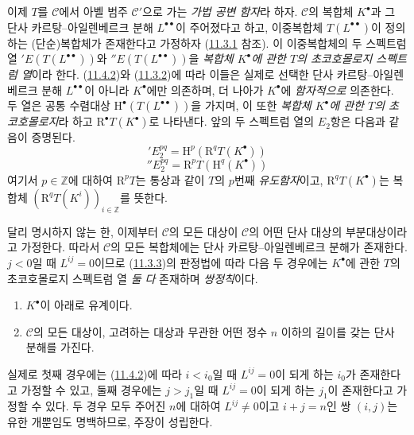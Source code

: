 \begin{env}[11.4.3]
\label{0.11.4.3-fr}
이제 $T$를 $\mathcal C$에서 아벨 범주 $\mathcal C'$으로 가는
\emph{가법 공변 함자}라 하자. $\mathcal C$의 복합체 $K^\bullet$과
그 단사 카르탕--아일렌베르크 분해 $L^{\bullet\bullet}$이 주어졌다고
하고, 이중복합체 $T(L^{\bullet\bullet})$이 정의하는 (단순)복합체가
존재한다고 가정하자
(\hyperref[0.11.3.1-fr]{11.3.1} 참조). 이 이중복합체의 두 스펙트럼 열
$'E(T(L^{\bullet\bullet}))$와 $''E(T(L^{\bullet\bullet}))$을
\emph{복합체 $K^\bullet$에 관한 $T$의 초코호몰로지 스펙트럼 열}이라
한다. (\hyperref[0.11.4.2-fr]{11.4.2})와
(\hyperref[0.11.3.2-fr]{11.3.2})에 따라 이들은 실제로 선택한 단사
카르탕--아일렌베르크 분해 $L^{\bullet\bullet}$이 아니라
$K^\bullet$에만 의존하며, 더 나아가 $K^\bullet$에 \emph{함자적으로}
의존한다. 두 열은 공통 수렴대상
$\mathrm H^\bullet(T(L^{\bullet\bullet}))$을 가지며, 이 또한
\emph{복합체 $K^\bullet$에 관한 $T$의 초코호몰로지}라 하고
$\mathrm R^\bullet T(K^\bullet)$로 나타낸다. 앞의 두 스펙트럼 열의
$E_2$항은 다음과 같음이 증명된다.
\[
  \label{0.11.4.3.1-fr}
  'E_2^{pq}=\mathrm H^p(\mathrm R^qT(K^\bullet))
  \tag{11.4.3.1}
\]
\[
  \label{0.11.4.3.2-fr}
  ''E_2^{pq}=\mathrm R^pT(\mathrm H^q(K^\bullet))
  \tag{11.4.3.2}
\]
여기서 $p\in\mathbb Z$에 대하여 $\mathrm R^pT$는 통상과 같이 $T$의
$p$번째 \emph{유도함자}이고, $\mathrm R^qT(K^\bullet)$는 복합체
$(\mathrm R^qT(K^i))_{i\in\mathbb Z}$를 뜻한다.

\label{0.11.4.4-fr}
달리 명시하지 않는 한, 이제부터 $\mathcal C$의 모든 대상이
$\mathcal C$의 어떤 단사 대상의 부분대상이라고 가정한다. 따라서
$\mathcal C$의 모든 복합체에는 단사 카르탕--아일렌베르크 분해가
존재한다. $j<0$일 때 $L^{ij}=0$이므로
(\hyperref[0.11.3.3-fr]{11.3.3})의 판정법에 따라 다음 두 경우에는
$K^\bullet$에 관한 $T$의 초코호몰로지 스펙트럼 열 \emph{둘 다} 존재하며
\emph{쌍정칙}이다.
\begin{enumerate}
  \item[$1^\circ$] $K^\bullet$이 아래로 유계이다.
  \item[$2^\circ$] $\mathcal C$의 모든 대상이, 고려하는 대상과 무관한
    어떤 정수 $n$ 이하의 길이를 갖는 단사 분해를 가진다.
\end{enumerate}
실제로 첫째 경우에는 (\hyperref[0.11.4.2-fr]{11.4.2})에 따라
$i<i_0$일 때 $L^{ij}=0$이 되게 하는 $i_0$가 존재한다고 가정할 수
있고, 둘째 경우에는 $j>j_1$일 때 $L^{ij}=0$이 되게 하는 $j_1$이
존재한다고 가정할 수 있다. 두 경우 모두 주어진 $n$에 대하여
$L^{ij}\neq0$이고 $i+j=n$인 쌍 $(i,j)$는 유한 개뿐임도 명백하므로,
주장이 성립한다.


\end{env}
